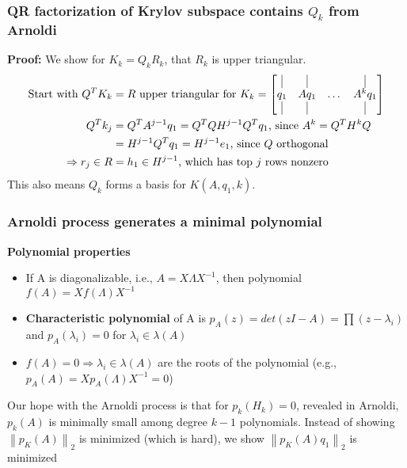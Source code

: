 \documentclass{article}
\newcommand{\norm}[2]{\left\lVert#1\right\rVert_#2}
\begin{document}
\subsubsection{QR factorization of Krylov subspace contains $Q_k$ from Arnoldi}
\textbf{Proof:} We show for $K_k = Q_kR_k$, that $R_k$ is upper triangular.
\begin{align*}
    \textrm{Start with } Q^TK_k &= R \textrm{ upper triangular for } K_k = \begin{bmatrix}
        \vline & \vline & & \vline \\ q_1 & Aq_1& \dots & A^kq_1 \\ \vline & \vline & & \vline \end{bmatrix}\\
        Q^Tk_j &= Q^TA^{j-1}q_1 = Q^T Q H^{j-1} Q^T q_1 \textrm{, since } A^k = Q^T H^k Q\\
        &= H^{j-1} Q^T q_1 = H^{j-1} e_1 \textrm{, since $Q$ orthogonal}\\
        \Rightarrow r_j \in R &= h_1 \in H^{j-1} \textrm{, which has top $j$ rows nonzero}
\end{align*}
This also means $Q_k$ forms a basis for $K(A, q_1, k)$.


\subsubsection{Arnoldi process generates a minimal polynomial}
\textbf{Polynomial properties}
\begin{itemize}
    \item If A is diagonalizable, i.e., $A = X\Lambda X^{-1}$, then polynomial $f(A) = Xf(\Lambda)X^{-1}$
    \item \textbf{Characteristic polynomial} of A is $p_A(z) = det(zI - A) = \prod(z - \lambda_i)$ and $p_A(\lambda_i) = 0$ for $\lambda_i \in \lambda(A)$
    \item $f(A) = 0 \Longrightarrow \lambda_i \in \lambda(A)$ are the roots of the polynomial (e.g., $p_A(A) = Xp_A(\Lambda)X^{-1} = 0$)
\end{itemize}
Our hope with the Arnoldi process is that for $p_k(H_k) = 0$, revealed in Arnoldi, $p_k(A)$ is minimally small among degree $k-1$ polynomials. Instead of showing $\norm{p_K(A)}{2}$ is minimized (which is hard), we show $\norm{p_K(A)q_1}{2}$ is minimized

\end{document}
